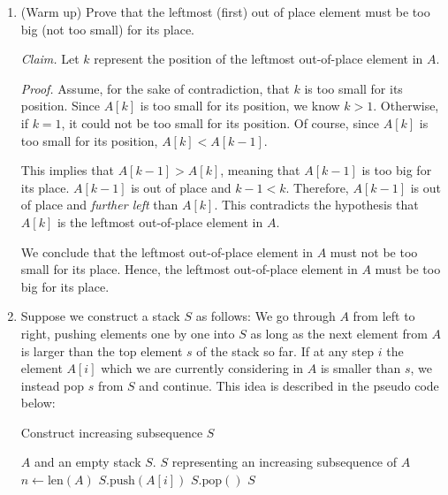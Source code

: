 \begin{enumerate}
    \item (Warm up) Prove that the leftmost (first) out of place element must be too big (not too small) for its place.
\begin{solution}
\textit{Claim. }Let $k$ represent the position of the leftmost out-of-place element in $A$.

\textit{Proof. }Assume, for the sake of contradiction, that $k$ is too small for its position. Since $A[k]$ is too small for its position, we know $k>1$. Otherwise, if $k=1$, it could not be too small for its position. Of course, since $A[k]$ is too small for its position, $A[k]<A[k-1]$.

This implies that $A[k-1]>A[k]$, meaning that $A[k-1]$ is too big for its place. $A[k-1]$ is out of place and $k-1<k$. Therefore, $A[k-1]$ is out of place and \textit{further left} than $A[k]$. This contradicts the hypothesis that $A[k]$ is the leftmost out-of-place element in $A$.

We conclude that the leftmost out-of-place element in $A$ must not be too small for its place. Hence, the leftmost out-of-place element in $A$ must be too big for its place.
\end{solution}
    
    \item Suppose we construct a stack $S$ as follows: We go through $A$ from left to right, pushing elements one by one into $S$ as long as the next element from $A$ is larger than the top element $s$ of the stack so far. If at any step $i$ the element $A[i]$ which we are currently considering in $A$ is smaller than $s$, we instead pop $s$ from $S$ and continue.
    This idea is described in the pseudo code below:
    
    \begin{minipage}{\linewidth}
    \begin{algorithm}[H]
    \label{incsubseq}
    \caption{Construct increasing subsequence $S$}
    \begin{algorithmic}
    \REQUIRE $A$ and an empty stack $S$.
    \ENSURE $S$ representing an increasing subsequence of $A$
    \STATE $n \leftarrow \text{len}(A)$
        \STATE $S.\text{push}(A[i])$
        \ELSE 
        \STATE $S.\text{pop}()$
        \ENDIF
    \ENDFOR
    \STATE \RETURN $S$
    \end{algorithmic}
    \end{algorithm}
    \end{minipage}
    

\end{enumerate}
